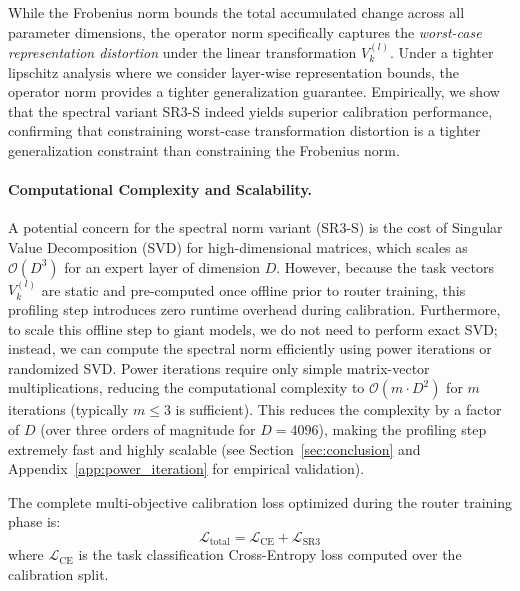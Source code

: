 While the Frobenius norm bounds the total accumulated change across all parameter dimensions, the operator norm specifically captures the \emph{worst-case representation distortion} under the linear transformation $V_k^{(l)}$. Under a tighter lipschitz analysis where we consider layer-wise representation bounds, the operator norm provides a tighter generalization guarantee. Empirically, we show that the spectral variant SR3-S indeed yields superior calibration performance, confirming that constraining worst-case transformation distortion is a tighter generalization constraint than constraining the Frobenius norm.

\paragraph{Computational Complexity and Scalability.} A potential concern for the spectral norm variant (SR3-S) is the cost of Singular Value Decomposition (SVD) for high-dimensional matrices, which scales as $\mathcal{O}(D^3)$ for an expert layer of dimension $D$. However, because the task vectors $V_k^{(l)}$ are static and pre-computed once offline prior to router training, this profiling step introduces zero runtime overhead during calibration. Furthermore, to scale this offline step to giant models, we do not need to perform exact SVD; instead, we can compute the spectral norm efficiently using power iterations or randomized SVD. Power iterations require only simple matrix-vector multiplications, reducing the computational complexity to $\mathcal{O}(m \cdot D^2)$ for $m$ iterations (typically $m \le 3$ is sufficient). This reduces the complexity by a factor of $D$ (over three orders of magnitude for $D=4096$), making the profiling step extremely fast and highly scalable (see Section~\ref{sec:conclusion} and Appendix~\ref{app:power_iteration} for empirical validation).

The complete multi-objective calibration loss optimized during the router training phase is:
\begin{equation}
    \mathcal{L}_{\text{total}} = \mathcal{L}_{\text{CE}} + \mathcal{L}_{\text{SR3}}
\end{equation}
where $\mathcal{L}_{\text{CE}}$ is the task classification Cross-Entropy loss computed over the calibration split.

